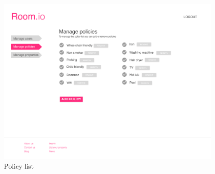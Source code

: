 \begin{figure}[H]
  \centering
  \includegraphics[width=\textwidth]{img/mockups/admin_policies.pdf}
  \caption{Policy list}
  \label{admin_policy}
\end{figure}
